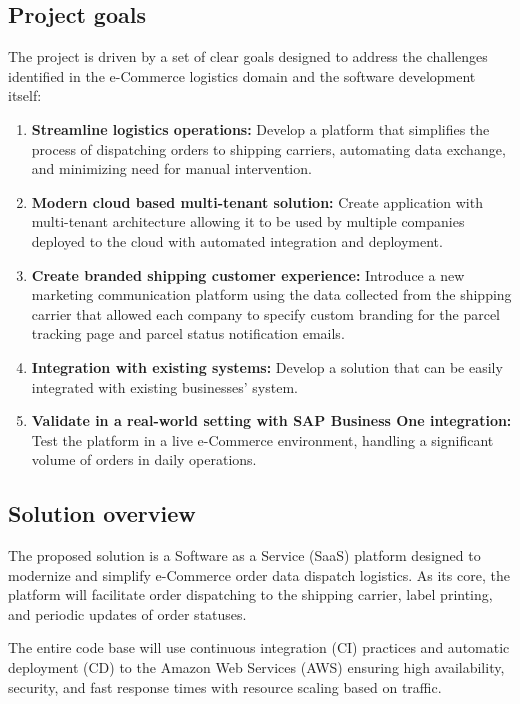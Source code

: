 \subsection*{Project goals}
\label{subsec:project-goals}
The project is driven by a set of clear goals designed to address the challenges identified in the e-Commerce logistics domain and the software development itself:
\begin{enumerate}[label=\bfseries G\arabic*:,leftmargin=*]
    \item \textbf{Streamline logistics operations:} Develop a platform that simplifies the process of dispatching orders to shipping carriers, automating data exchange, and minimizing need for manual intervention.
    \item \textbf{Modern cloud based multi-tenant solution:} Create application with multi-tenant architecture allowing it to be used by multiple companies deployed to the cloud with automated integration and deployment. 
    \item \textbf{Create branded shipping customer experience:} Introduce a new marketing communication platform using the data collected from the shipping carrier that allowed each company to specify custom branding for the parcel tracking page and parcel status notification emails.
    \item \textbf{Integration with existing systems:} Develop a solution that can be easily integrated with existing businesses' system.
    \item \textbf{Validate in a real-world setting with SAP Business One integration:} Test the platform in a live e-Commerce environment, handling a significant volume of orders in daily operations.
\end{enumerate}

\subsection*{Solution overview}
\label{subsec:solution-overview}
The proposed solution is a Software as a Service (\ac{SaaS}) platform designed to modernize and simplify e-Commerce order data dispatch logistics. As its core, the platform will facilitate order dispatching to the shipping carrier, label printing, and periodic updates of order statuses. 

The entire code base will use continuous integration (\ac{CI}) practices and automatic deployment (\ac{CD}) to the Amazon Web Services (\ac{AWS}) ensuring high availability, security, and fast response times with resource scaling based on traffic.

